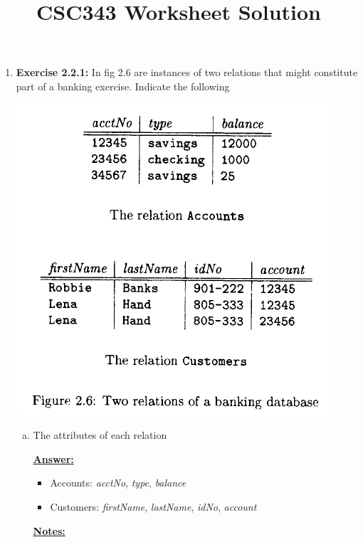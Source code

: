 \documentclass[12pt]{article}
\begin{document}
\title{CSC343 Worksheet Solution}
\maketitle

\bigskip


\begin{enumerate}[1.]
    \item \textbf{Exercise 2.2.1:} In fig 2.6 are instances of two relations that might
    constitute part of a banking exercise. Indicate the following

    \begin{center}
    \includegraphics[width=0.6\linewidth]{images/worksheet_1_1.png}
    \end{center}

    \begin{enumerate}[a)]
        \item The attributes of each relation

        \begin{mdframed}
            \underline{\textbf{Answer:}}

            \bigskip

            \begin{itemize}
                \item Accounts: \textit{acctNo}, \textit{type}, \textit{balance}
                \item Customers: \textit{firstName}, \textit{lastName}, \textit{idNo}, \textit{account}
            \end{itemize}
        \end{mdframed}

        \bigskip

        \underline{\textbf{Notes:}}


\end{enumerate}
\end{enumerate}
\end{document}
